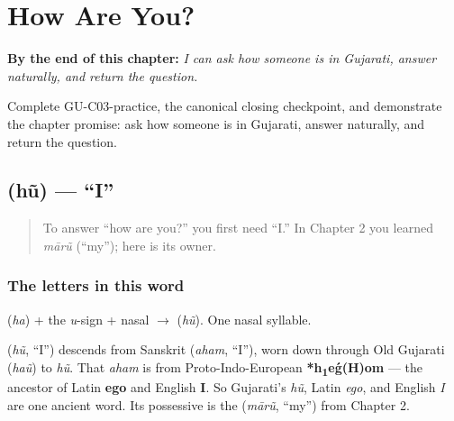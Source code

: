 
\chapter{How Are You?}
\label{ch:responding}

\begin{chapteropening}
\textbf{By the end of this chapter:} \emph{I can ask how someone is in Gujarati, answer naturally, and return the question.}

Complete GU-C03-practice, the canonical closing checkpoint, and demonstrate the chapter promise: ask how someone is in Gujarati, answer naturally, and return the question.
\end{chapteropening}

\section[\gu{હું}]{ (hũ) — \textquotedblleft{}I\textquotedblright{}}

\label{lesson:GU-C03-hun}



\begin{quote}
To answer \textquotedblleft{}how are you?\textquotedblright{} you first need \textquotedblleft{}I.\textquotedblright{} In Chapter 2 you learned \emph{mārũ} (\textquotedblleft{}my\textquotedblright{}); here is its owner.
\end{quote}

\subsection*{The letters in this word}
\textbf{} (\emph{ha}) + the \emph{u}-sign + nasal $\to$ \textbf{} (\emph{hũ}). One nasal syllable.

\begin{cousinweb}
\textbf{} (\emph{hũ}, \textquotedblleft{}I\textquotedblright{}) descends from Sanskrit \textbf{} (\emph{aham}, \textquotedblleft{}I\textquotedblright{}), worn down through Old Gujarati (\emph{haũ}) to \emph{hũ}. That \emph{aham} is from Proto-Indo-European \textbf{*h\textsubscript{1}eǵ(H)om} — the ancestor of Latin \textbf{ego} and English \textbf{I}. So Gujarati's \emph{hũ}, Latin \emph{ego}, and English \emph{I} are one ancient word. Its possessive is the \textbf{} (\emph{mārũ}, \textquotedblleft{}my\textquotedblright{}) from Chapter 2.
\end{cousinweb}

